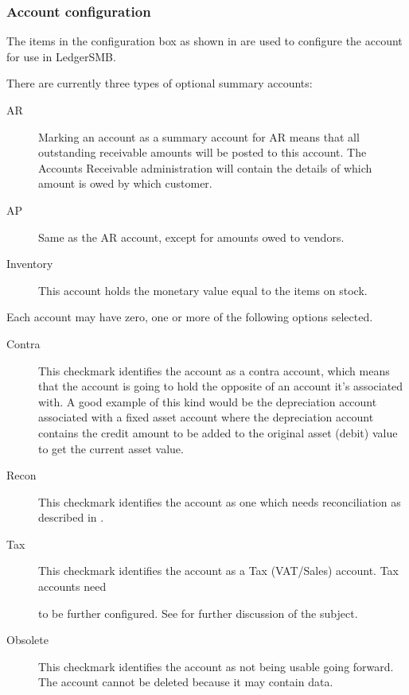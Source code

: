 \subsubsection{Account configuration}
\label{subsec-coa-account-configuration}

The items in the configuration box as shown in  are used to configure the account for use in LedgerSMB.

There are currently three types of optional summary accounts:

\begin{description}
    \item [AR] Marking an account as a summary account for AR means that all outstanding
    receivable amounts will be posted to this account. The Accounts Receivable administration
    will contain the details of which amount is owed by which \gls{customer}.
    \item [AP] Same as the AR account, except for amounts owed to vendors.
    \item [Inventory] This account holds the monetary value equal to the items on stock.
\end{description}

Each account may have zero, one or more of the following options selected.

\begin{description}
    \item[Contra] This checkmark identifies the account as a \gls{contra} account, which means
    that the account is going to hold the opposite of an account it's associated with.
    A good example of this kind would be the depreciation account associated with a fixed
    asset account where the depreciation account contains the credit amount to be added to
    the original asset (debit) value to get the current asset value.
    \item[Recon] This checkmark identifies the account as one which needs reconciliation as
    described in .
    \item[Tax] This checkmark identifies the account as a Tax (VAT/Sales) account. Tax accounts need

    to be further configured. See  for further discussion of the
    subject.
    \item[Obsolete] This checkmark identifies the account as not being usable going forward.  The account cannot be deleted because it may
    contain data.
    \label{item:AccountOptionsTax}
\end{description}


